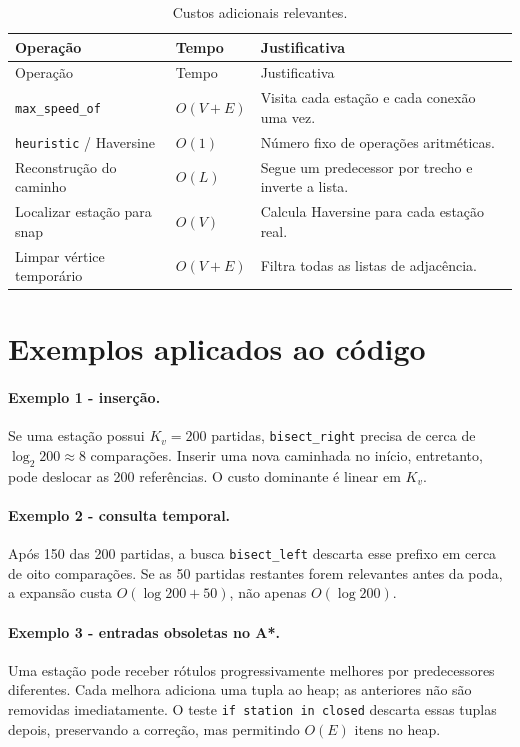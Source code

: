 \documentclass[11pt,a4paper]{article}
\begin{document}
\begin{longtable}{@{}p{}p{}p{}@{}}
\caption{Custos adicionais relevantes.}\\
\toprule
Operação & Tempo & Justificativa \\
\midrule
\endfirsthead
\toprule
Operação & Tempo & Justificativa \\
\midrule
\endhead
\texttt{max\_speed\_of} & $O(V+E)$ & Visita cada estação e cada conexão uma vez. \\
\texttt{heuristic} / Haversine & $O(1)$ & Número fixo de operações aritméticas. \\
Reconstrução do caminho & $O(L)$ & Segue um predecessor por trecho e inverte a lista. \\
Localizar estação para snap & $O(V)$ & Calcula Haversine para cada estação real. \\
Limpar vértice temporário & $O(V+E)$ & Filtra todas as listas de adjacência. \\
\bottomrule
\end{longtable}

\section{Exemplos aplicados ao código}

\paragraph{Exemplo 1 - inserção.}
Se uma estação possui $K_v=200$ partidas, \texttt{bisect\_right} precisa de
cerca de $\log_2 200\approx 8$ comparações. Inserir uma nova caminhada no
início, entretanto, pode deslocar as 200 referências. O custo dominante é
linear em $K_v$.

\paragraph{Exemplo 2 - consulta temporal.}
Após 150 das 200 partidas, a busca \texttt{bisect\_left}
descarta esse prefixo em cerca de oito comparações. Se as 50 partidas restantes
forem relevantes antes da poda, a expansão custa $O(\log 200+50)$, não apenas
$O(\log 200)$.

\paragraph{Exemplo 3 - entradas obsoletas no A*.}
Uma estação pode receber rótulos progressivamente melhores por predecessores
diferentes. Cada melhora adiciona uma tupla ao heap; as anteriores não são
removidas imediatamente. O teste \texttt{if station in closed} descarta essas
tuplas depois, preservando a correção, mas permitindo $O(E)$ itens no heap.
\end{document}

